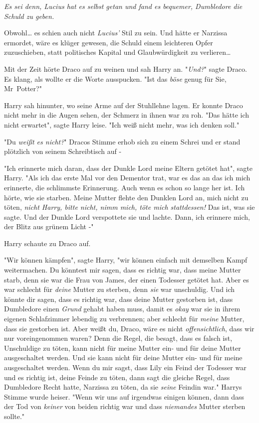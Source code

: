{\emph{Es sei denn, Lucius hat es selbst getan und fand es bequemer, Dumbledore die Schuld zu geben.}

Obwohl… es schien auch nicht \emph{Lucius'} Stil zu sein. Und hätte er Narzissa ermordet, wäre es klüger gewesen, die Schuld einem leichteren Opfer zuzuschieben, statt politisches Kapital und Glaubwürdigkeit zu verlieren…

Mit der Zeit hörte Draco auf zu weinen und sah Harry an. "\emph{Und?}" sagte Draco. Es klang, als wollte er die Worte ausspucken. "Ist das \emph{böse} genug für Sie, Mr~Potter?"

Harry sah hinunter, wo seine Arme auf der Stuhllehne lagen. Er konnte Draco nicht mehr in die Augen sehen, der Schmerz in ihnen war zu roh. "Das hätte ich nicht erwartet", sagte Harry leise. "Ich weiß nicht mehr, was ich denken soll."

"Du \emph{weißt es nicht?}" Dracos Stimme erhob sich zu einem Schrei und er stand plötzlich von seinem Schreibtisch auf -

"Ich erinnerte mich daran, dass der Dunkle Lord meine Eltern getötet hat", sagte Harry. "Als ich das erste Mal vor den Dementor trat, war es das an das ich mich erinnerte, die schlimmste Erinnerung. Auch wenn es schon so lange her ist. Ich hörte, wie sie starben. Meine Mutter flehte den Dunklen Lord an, mich nicht zu töten, \emph{nicht Harry, bitte nicht, nimm mich, töte mich stattdessen!} Das ist, was sie sagte. Und der Dunkle Lord verspottete sie und lachte. Dann, ich erinnere mich, der Blitz aus grünem Licht -"

Harry schaute zu Draco auf.

"Wir können kämpfen", sagte Harry, "wir können einfach mit demselben Kampf weitermachen. Du könntest mir sagen, dass es richtig war, dass meine Mutter starb, denn sie war die Frau von James, der einen Todesser getötet hat. Aber es war schlecht für \emph{deine} Mutter zu sterben, denn \emph{sie} war unschuldig. Und ich könnte dir sagen, dass es richtig war, dass deine Mutter gestorben ist, dass Dumbledore einen \emph{Grund} gehabt haben muss, damit es \emph{okay} war sie in ihrem eigenen Schlafzimmer lebendig zu verbrennen; aber schlecht für \emph{meine} Mutter, dass sie gestorben ist. Aber weißt du, Draco, wäre es nicht \emph{offensichtlich}, dass wir nur voreingenommen waren? Denn die Regel, die besagt, dass es falsch ist, Unschuldige zu töten, kann nicht für meine Mutter ein- und für deine Mutter ausgeschaltet werden. Und sie kann nicht für deine Mutter ein- und für meine ausgeschaltet werden. Wenn du mir sagst, dass Lily ein Feind der Todesser war und es richtig ist, deine Feinde zu töten, dann sagt die gleiche Regel, dass Dumbledore Recht hatte, Narzissa zu töten, da sie \emph{seine} Feindin war." Harrys Stimme wurde heiser. "Wenn wir uns auf irgendwas einigen können, dann dass der Tod von \emph{keiner} von beiden richtig war und dass \emph{niemandes} Mutter sterben sollte."

}

